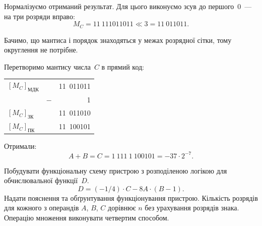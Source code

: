 \documentclass[a4paper,oneside,DIV=12,12pt]{scrartcl}
\newcommand{\ShiftLeft}{\ll}
\begin{document}
\begin{solution}
		Нормалізуємо отриманий результат. Для цього виконуємо зсув до першого~$0$~— на три розряди вправо:
		\[
			M_C = 11~111011011 \ShiftLeft 3 = 11~011011.
		\]
		
		Бачимо, що мантиса і порядок знаходяться у межах розрядної сітки, тому округлення не потрібне.
		
		Перетворимо мантису числа~$C$ в прямий код:
		\begin{table}[H]
		\centering
			\begin{tabular}{
				l            %
				r@{\,}       %
				r            %
				}
				$\left[ M_C\right]_{\text{МДК}}$  &     & 11{~}011011\\
				                                  & $-$ &           1\\
				\cmidrule(r){3-3}
				$\left[ M_C \right]_{\text{ЗК}}$  &     & 11{~}011010\\
				$\left[ M_C \right]_{\text{ПК}}$  &     & 11{~}100101\\
			\end{tabular}
		\end{table}
		
		Отримали:
		\[
			A + B = C = 1~111~1~100101 = -37 \cdot 2^{-7}.
		\]
	\end{solution}
	
	\begin{exercise}
		Побудувати функціональну схему пристрою з розподіленою логікою для обчислювальної функції~$D$.
		\[
			D = (-1 / 4) \cdot C - 8A \cdot (B - 1).
		\]
		Надати пояснення та обґрунтування функціонування пристрою. Кількість розрядів для кожного з операндів $A$, $B$, $C$ дорівнює $n$ без урахування розрядів знака. Операцію множення виконувати четвертим способом.
	\end{exercise}
\end{document}
